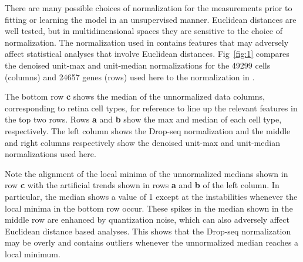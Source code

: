 \documentclass[10pt,letterpaper]{article}
\begin{document}
There are many possible choices of normalization for the measurements prior to fitting or learning the model in an unsupervised manner.
Euclidean distances are well tested, but in multidimensional spaces they are sensitive to the choice of normalization.
The normalization used in \cite{dropseq} contains features that may adversely affect statistical analyses that involve Euclidean distances.
Fig~\ref{fig:1} compares the denoised unit-max and unit-median normalizations for the 49299 cells (columns) and 24657 genes (rows) used here to the normalization in \cite{dropseq}.

The bottom row \textbf{c} shows the median of the unnormalized data columns, corresponding to retina cell types, for reference to line up the relevant features in the top two rows.
Rows \textbf{a} and \textbf{b} show the max and median of each cell type, respectively.
The left column shows the Drop-seq normalization and the middle and right columns respectively show the denoised unit-max and unit-median normalizations used here.

Note the alignment of the local minima of the unnormalized medians shown in row \textbf{c} with the artificial trends shown in rows \textbf{a} and \textbf{b} of the left column.
In particular, the median shows a value of 1 except at the instabilities whenever the local minima in the bottom row occur.
These spikes in the median shown in the middle row are enhanced by quantization noise, which can also adversely affect Euclidean distance based analyses.
This shows that the Drop-seq normalization may be overly and contains outliers whenever the unnormalized median reaches a local minimum.
\end{document}
